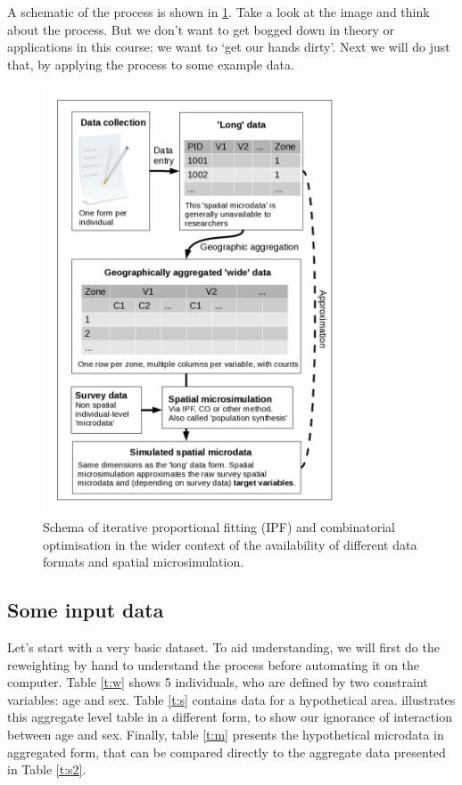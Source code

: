 \documentclass[a4paper, 11pt, twoside]{article}
\begin{document}
A schematic of the process is shown in \cref{fmsim-schema}.
Take a look at the image and think about the process. But we don't want to get
bogged down in theory or applications in this course: we want to `get our
hands dirty'. Next we will do just that, by applying the process to some
example data.

\begin{figure}[H]
\begin{center}
  \includegraphics[width=9cm]{msim-schema}
\end{center}
\caption{Schema of iterative proportional fitting (IPF) and combinatorial
optimisation
in the wider context of the availability of different data formats and spatial
microsimulation. \label{fmsim-schema}}
\end{figure}


\subsection{Some input data} \label{s:theory}

Let's start with a very basic dataset. To aid understanding, we will first do
the reweighting by hand
to understand the process before automating it on the computer.
Table \ref{t:w} shows 5 individuals, who are defined by two
constraint variables: age and sex.
Table \ref{t:s} contains data for a hypothetical area.  illustrates
this aggregate level table in a different form,
to show our ignorance of interaction between age and sex. Finally, table
\ref{t:m} presents the hypothetical microdata in aggregated form,
that can be compared directly to the aggregate data presented in
Table \ref{t:s2}.
\end{document}
